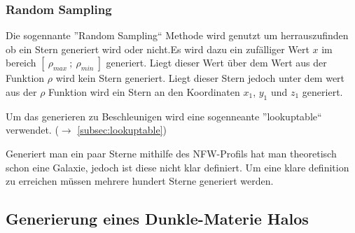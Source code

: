 \subsubsection{Random Sampling}

Die sogennante ''Random Sampling`` Methode wird genutzt um herrauszufinden ob
ein Stern generiert wird oder nicht.Es wird dazu ein zufälliger
Wert \( x \) im bereich \( [~\rho_{max}~;~\rho_{min}~] \) generiert. Liegt dieser
Wert über dem Wert aus der Funktion \( \rho \) wird kein Stern generiert.
Liegt dieser Stern jedoch unter dem wert aus der \( \rho \) Funktion wird
ein Stern an den Koordinaten \( x_1 \), \( y_1 \) und \( z_1 \) generiert.

Um das generieren zu Beschleunigen wird eine sogenneante ''lookuptable``
verwendet. (\( \rightarrow \) \ref{subsec:lookuptable})

Generiert man ein paar Sterne mithilfe des NFW-Profils hat man theoretisch
schon eine Galaxie, jedoch ist diese nicht klar definiert. Um eine klare
definition zu erreichen müssen mehrere hundert Sterne generiert werden.

%

%
%


\subsection{Generierung eines Dunkle-Materie Halos}

